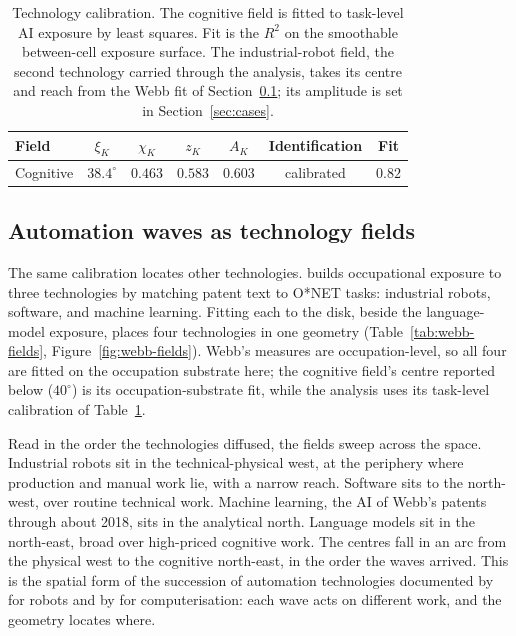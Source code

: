 \documentclass[12pt, a4paper]{article}
\begin{document}
\begin{table}[!htbp]
\centering
\caption{Technology calibration. The cognitive field is fitted to task-level AI exposure by least squares. Fit is the $R^2$ on the smoothable between-cell exposure surface. The industrial-robot field, the second technology carried through the analysis, takes its centre and reach from the Webb fit of Section~\ref{sec:automation-waves}; its amplitude is set in Section~\ref{sec:cases}.}
\label{tab:technology-calibration-new}
\begin{tabular}{lcccccc}
\toprule
Field & $\xi_K$ & $\chi_K$ & $z_K$ & $A_K$ & Identification & Fit \\
\midrule
Cognitive & $38.4^\circ$ & $0.463$ & $0.583$ & $0.603$ & calibrated & $0.82$ \\
\bottomrule
\end{tabular}
\end{table}

\subsection{Automation waves as technology fields}
\label{sec:automation-waves}

The same calibration locates other technologies. \textcite{webb2020}
builds occupational exposure to three technologies by matching patent
text to O*NET tasks: industrial robots, software, and machine learning.
Fitting each to the disk, beside the language-model exposure, places
four technologies in one geometry (Table~\ref{tab:webb-fields},
Figure~\ref{fig:webb-fields}). Webb's measures are occupation-level, so
all four are fitted on the occupation substrate here; the cognitive
field's centre reported below ($40^\circ$) is its occupation-substrate
fit, while the analysis uses its task-level calibration of
Table~\ref{tab:technology-calibration-new}.

Read in the order the technologies diffused, the fields sweep across the
space. Industrial robots sit in the technical-physical west, at the
periphery where production and manual work lie, with a narrow reach.
Software sits to the north-west, over routine technical work. Machine
learning, the AI of Webb's patents through about 2018, sits in the
analytical north. Language models sit in the north-east, broad over
high-priced cognitive work. The centres fall in an arc from the physical
west to the cognitive north-east, in the order the waves arrived. This
is the spatial form of the succession of automation technologies
documented by \textcite{acemoglu2020robots} for robots and by
\textcite{autor2003} for computerisation: each wave acts on different
work, and the geometry locates where.
\end{document}
